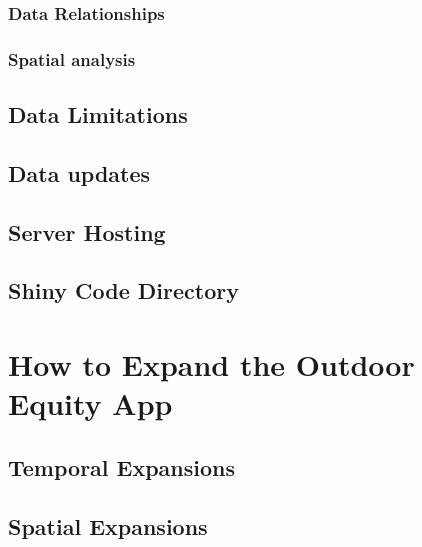 \documentclass[
]{book}
\begin{document}
\hypertarget{data-relationships-1}{%
\subsubsection{Data Relationships}\label{data-relationships-1}}

\hypertarget{spatial-analysis}{%
\subsubsection{Spatial analysis}\label{spatial-analysis}}

\hypertarget{data-limitations}{%
\subsection{Data Limitations}\label{data-limitations}}

\hypertarget{data-updates}{%
\subsection{Data updates}\label{data-updates}}

\hypertarget{server-hosting}{%
\subsection{Server Hosting}\label{server-hosting}}

\hypertarget{shiny-code-directory}{%
\subsection{Shiny Code Directory}\label{shiny-code-directory}}

\hypertarget{how-to-expand-the-outdoor-equity-app}{%
\section{How to Expand the Outdoor Equity App}\label{how-to-expand-the-outdoor-equity-app}}

\hypertarget{temporal-expansions}{%
\subsection{Temporal Expansions}\label{temporal-expansions}}

\hypertarget{spatial-expansions}{%
\subsection{Spatial Expansions}\label{spatial-expansions}}
\end{document}
